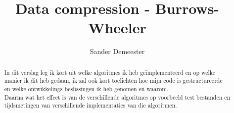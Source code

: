 \documentclass[10pt,a4paper]{report}
\author{Sander Demeester}
\title{Data compression - Burrows-Wheeler}
\begin{document}
\maketitle
\begin{abstract}
In dit verslag leg ik kort uit welke algoritmes ik heb ge\"implementeerd en op welke manier ik dit heb gedaan, ik zal ook kort toelichten hoe mijn code is gestructureerde en welke ontwikkelings beslissingen ik heb genomen en waarom.\\
\hline
Daarna wat het effect is van de verschillende algoritmes op voorbeeld test bestanden en tijdsmetingen van verschillende implementaties van die algoritmen. 
\end{abstract}
\end{document}
